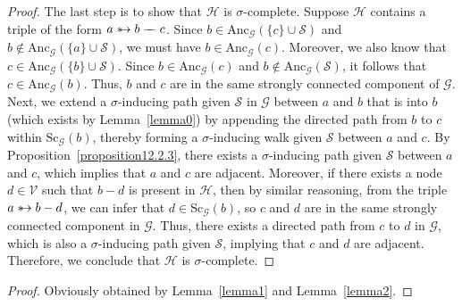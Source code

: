 \documentclass[accepted]{uai2025} %
\newcommand{\anc}{\text{Anc}}
\newcommand{\suh}{\mathrel{{\ast\mkern-11mu\to}}}
\newcommand{\tut}{\mathrel{{\relbar\mkern-9mu\relbar}}}
\begin{document}
\begin{proof}
The last step is to show that $\mathcal{H}$ is $\sigma$-complete. Suppose \( \mathcal{H} \) contains a triple of the form \( a\suh b\tut c \). Since \( b \in \anc_\mathcal{G}(\{c\} \cup \mathcal{S}) \) and \( b \notin \anc_\mathcal{G}(\{a\} \cup \mathcal{S}) \), we must have \( b \in \anc_\mathcal{G}(c) \). Moreover, we also know that \( c \in \anc_\mathcal{G}(\{b\} \cup \mathcal{S}) \). Since \( b \in \anc_\mathcal{G}(c) \) and \( b \notin \anc_\mathcal{G}(\mathcal{S}) \), it follows that \( c \in \anc_\mathcal{G}(b) \). Thus, \( b \) and \( c \) are in the same strongly connected component of \( \mathcal{G} \). Next, we extend a \( \sigma \)-inducing path given \( \mathcal{S} \) in \( \mathcal{G} \) between \( a \) and \( b \) that is into \( b \) (which exists by Lemma~\ref{lemma0}) by appending the directed path from \( b \) to \( c \) within \( \text{Sc}_{\mathcal{G}}(b) \), thereby forming a \( \sigma \)-inducing walk given \( \mathcal{S} \) between \( a \) and \( c \). By Proposition~\ref{proposition12.2.3}, there exists a \( \sigma \)-inducing path given \( \mathcal{S} \) between \( a \) and \( c \), which implies that \( a \) and \( c \) are adjacent. Moreover, if there exists a node \( d \in \mathcal{V} \) such that \( b - d \) is present in \( \mathcal{H} \), then by similar reasoning, from the triple \( a \suh  b - d \), we can infer that \( d \in \text{Sc}_\mathcal{G}(b) \), so \( c \) and \( d \) are in the same strongly connected component in \( \mathcal{G} \). Thus, there exists a directed path from \( c \) to \( d \) in \( \mathcal{G} \), which is also a \( \sigma \)-inducing path given \( \mathcal{S} \), implying that \( c \) and \( d \) are adjacent. Therefore, we conclude that $\mathcal{H}$ is $\sigma$-complete.
\end{proof}




\thmone*
\begin{proof}
Obviously obtained by Lemma~\ref{lemma1} and Lemma~\ref{lemma2}.
\end{proof}
\end{document}
